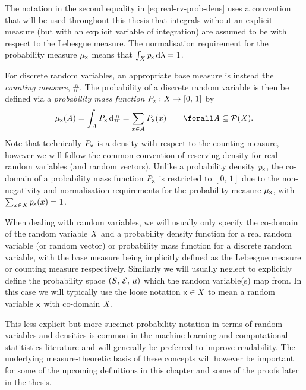 The notation in the second equality in \eqref{eq:real-rv-prob-dens} uses a convention that will be used throughout this thesis that integrals without an explicit measure (but with an explicit variable of integration) are assumed to be with respect to the Lebesgue measure. The normalisation requirement for the probability measure $\mu_{\mathsf{x}}$ means that $\int_{\mathit{X}}\mathit{p}_{\mathsf{x}}\,\mathrm{d}\lambda = 1$.

For discrete random variables, an appropriate base measure is instead the \emph{counting measure}, $\#$. The probability of a discrete random variable is then be defined via a \emph{probability mass function} $\mathit{P}_{\mathsf{x}} : \mathit{X} \to [0,\,1]$ by
\begin{equation}
    \mu_{\rvar{x}}(\set{A})
    = \int_{\set{A}} \probnoarg{\rvar{x}} \,\dr\#
    = \sum_{x \in \set{A}} \prob{\rvar{x}}{x} 
    \qquad
    \forall \set{A} \subseteq \sset{P}(\set{X}).
\end{equation}
Note that technically $\mathit{P}_{\mathsf{x}}$ is a density with respect to the counting measure, however we will follow the common convention of reserving density for real random variables (and random vectors). Unlike a probability density $\mathit{p}_{\mathsf{x}}$, the co-domain of a probability mass function $\mathit{P}_{\mathsf{x}}$ is restricted to $[0,\,1]$ due to the non-negativity and normalisation requirements for the probability measure $\mu_{\mathsf{x}}$, with $\sum_{x\in\set{X}} \pden{\rvar{x}}{x} = 1$.

When dealing with random variables, we will usually only specify the co-domain of the random variable $\mathit{X}$ and a probability density function for a real random variable (or random vector) or probability mass function for a discrete random variable, with the base measure being implicitly defined as the Lebesgue measure or counting measure respectively. Similarly we will usually neglect to explicitly define the probability space $(\mathit{S},\,\mathcal{E},\,\mu)$ which the random variable(s) map from. In this case we will typically use the loose notation $\mathsf{x} \in \mathit{X}$ to mean a random variable $\mathsf{x}$ with co-domain $\mathit{X}$.

This less explicit but more succinct probability notation in terms of random variables and densities is common in the machine learning and computational statitistics literature and will generally be preferred to improve readability. The underlying measure-theoretic basis of these concepts will however be important for some of the upcoming definitions in this chapter and some of the proofs later in the thesis.


